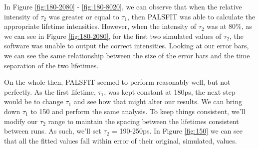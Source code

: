 In Figure \ref{fig:180-2080} - \ref{fig:180-8020}, we can observe that when the relative intensity of $\tau_2$ was greater or equal to $\tau_1$, then PALSFIT was able to calculate the appropriate lifetime intensities. However, when the intensity of $\tau_2$ was at 80\%, as we can see in Figure \ref{fig:180-2080}, for the first two simulated values of $\tau_2$, the software was unable to output the correct intensities. Looking at our error bars, we can see the same relationship between the size of the error bars and the time separation of the two lifetimes.

On the whole then, PALSFIT seemed to perform reasonably well, but not perfectly. As the first lifetime, $\tau_1$, was kept constant at 180ps, the next step would be to change $\tau_1$ and see how that might alter our results. We can bring down $\tau_1$ to 150 and perform the same analysis.  To keep things consistent, we’ll modify our $\tau_2$ range to maintain the spacing between the lifetimes consistent between runs. As such, we’ll set $\tau_2$ = 190-250ps. In Figure \ref{fig:150} we can see that all the fitted values fall within error of their original, simulated, values. 

\begin{figure}[H]
    \centering
    \caption{}
    \label{fig:150-tau}
\end{figure}

